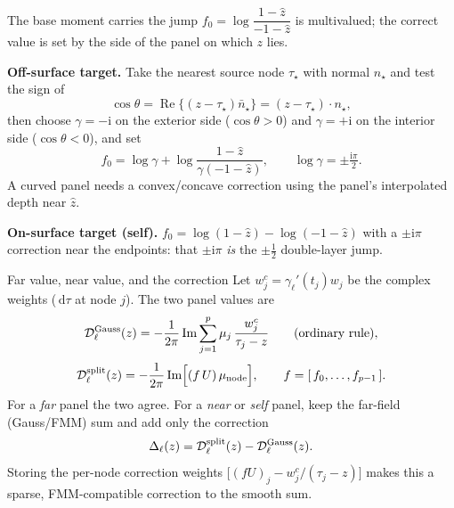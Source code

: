 \documentclass[aspectratio=169,11pt]{beamer}
\newcommand{\dd}{\,\mathrm d}
\newcommand{\ii}{\mathrm i}
\begin{document}
\begin{frame}{The base moment carries the jump}
\small
$f_0=\log\dfrac{1-\hat z}{-1-\hat z}$ is multivalued; the correct value is set by
the side of the panel on which $z$ lies.

\vspace{1mm}
\textbf{Off-surface target.}  Take the nearest source node $\tau_\star$ with
normal $n_\star$ and test the sign of
\[
  \cos\theta=\operatorname{Re}\{(z-\tau_\star)\bar n_\star\}=(z-\tau_\star)\cdot n_\star,
\]
then choose $\gamma=-\ii$ on the exterior side ($\cos\theta>0$) and
$\gamma=+\ii$ on the interior side ($\cos\theta<0$), and set
\[
  f_0=\log\gamma+\log\frac{1-\hat z}{\gamma(-1-\hat z)},
  \qquad \log\gamma=\pm\tfrac{\ii\pi}{2}.
\]
A curved panel needs a convex/concave correction using the panel's interpolated
depth near $\hat z$.

\vspace{1mm}
\textbf{On-surface target (self).}  $f_0=\log(1-\hat z)-\log(-1-\hat z)$ with a
$\pm\ii\pi$ correction near the endpoints: that $\pm\ii\pi$ \emph{is} the
$\pm\tfrac12$ double-layer jump.
\end{frame}

\begin{frame}{Far value, near value, and the correction}
\small
Let $w^{c}_j=\gamma_\ell'(t_j)w_j$ be the complex weights ($\dd\tau$ at node
$j$).  The two panel values are
\[
  \mathcal{D}_\ell^{\rm Gauss}(z)=-\frac{1}{2\pi}\operatorname{Im}\sum_{j=1}^{p}\mu_j\,
  \frac{w^{c}_j}{\tau_j-z}
  \qquad(\text{ordinary rule}),
\]
\[
  \mathcal{D}_\ell^{\rm split}(z)=-\frac{1}{2\pi}\operatorname{Im}\Bigl[(f\,U)\,\mu_{\rm node}\Bigr],
  \qquad f=[\,f_0,\ldots,f_{p-1}\,].
\]
For a \emph{far} panel the two agree.  For a \emph{near} or \emph{self} panel,
keep the far-field (Gauss/FMM) sum and add only the correction
\[
  \Delta_\ell(z)=\mathcal{D}_\ell^{\rm split}(z)-\mathcal{D}_\ell^{\rm Gauss}(z).
\]
Storing the per-node correction weights
$\bigl[(fU)_j-w^{c}_j/(\tau_j-z)\bigr]$ makes this a sparse, FMM-compatible
correction to the smooth sum.
\end{frame}
\end{document}
